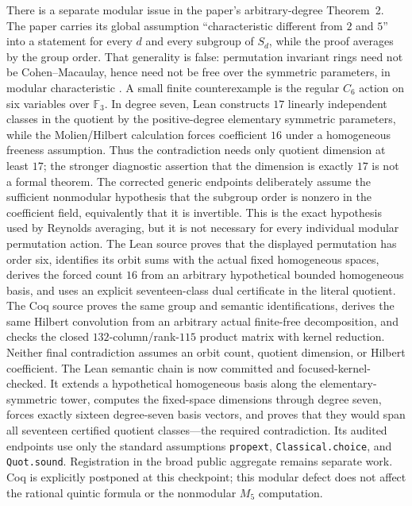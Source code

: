 \documentclass[11pt,a4paper,oneside]{article}
\newcommand{\lean}[1]{\nolinkurl{#1}}
\begin{document}
There is a separate modular issue in the paper's arbitrary-degree Theorem~2.
The paper carries its global assumption ``characteristic different from $2$
and $5$'' into a statement for every $d$ and every subgroup of $S_d$, while
the proof averages by the group order.  That generality is false: permutation
invariant rings need not be Cohen--Macaulay, hence need not be free over the
symmetric parameters, in modular characteristic
\cite{BlumSmithMarques2018}.  A small finite counterexample is the regular
$C_6$ action on six variables over $\mathbb F_3$.  In degree seven, Lean
constructs $17$ linearly independent classes in the quotient by the
positive-degree elementary symmetric parameters, while the Molien/Hilbert
calculation forces coefficient $16$ under a homogeneous freeness assumption.
Thus the contradiction needs only quotient dimension at least $17$; the
stronger diagnostic assertion that the dimension is exactly $17$ is not a
formal theorem.  The corrected generic endpoints deliberately assume the
sufficient nonmodular hypothesis that the subgroup order is nonzero in the
coefficient field, equivalently that it is invertible.  This is the exact
hypothesis used by Reynolds averaging, but it is not necessary for every
individual modular permutation action.  The Lean source proves
that
the displayed permutation has order six, identifies its orbit sums with the
actual fixed homogeneous spaces, derives the forced count $16$ from an
arbitrary hypothetical bounded homogeneous basis, and uses an explicit
seventeen-class dual certificate in the literal quotient.  The Coq source
proves the same group and semantic identifications, derives the same Hilbert
convolution from an arbitrary actual finite-free decomposition, and checks
the closed $132$-column/rank-$115$ product matrix with kernel reduction.
Neither final contradiction assumes an orbit count, quotient dimension, or
Hilbert coefficient.  The Lean semantic chain is now committed and
focused-kernel-checked.  It extends a hypothetical homogeneous basis along
the elementary-symmetric tower, computes the fixed-space dimensions through
degree seven, forces exactly sixteen degree-seven basis vectors, and proves
that they would span all seventeen certified quotient classes---the required
contradiction.  Its audited endpoints use only the standard assumptions
\lean{propext}, \lean{Classical.choice}, and \lean{Quot.sound}.  Registration
in the broad public aggregate remains separate work.  Coq is explicitly
postponed at this checkpoint; this modular defect does not affect the rational
quintic formula or the nonmodular $M_5$ computation.
\end{document}

